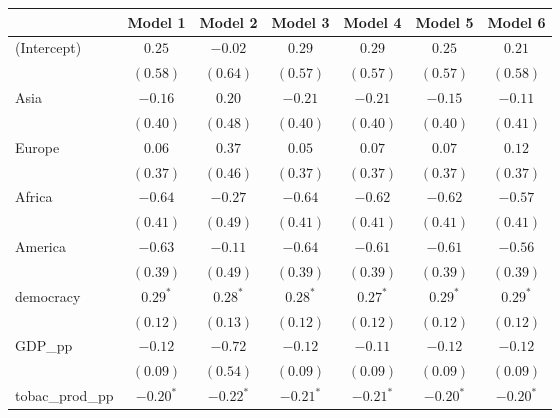 
\begin{table}[!h]
\begin{center}
\begin{tabular}{l c c c c c c }
\toprule
 & Model 1 & Model 2 & Model 3 & Model 4 & Model 5 & Model 6 \\
\midrule
(Intercept)             & $0.25$       & $-0.02$      & $0.29$       & $0.29$       & $0.25$       & $0.21$       \\
                        & $(0.58)$     & $(0.64)$     & $(0.57)$     & $(0.57)$     & $(0.57)$     & $(0.58)$     \\
Asia                    & $-0.16$      & $0.20$       & $-0.21$      & $-0.21$      & $-0.15$      & $-0.11$      \\
                        & $(0.40)$     & $(0.48)$     & $(0.40)$     & $(0.40)$     & $(0.40)$     & $(0.41)$     \\
Europe                  & $0.06$       & $0.37$       & $0.05$       & $0.07$       & $0.07$       & $0.12$       \\
                        & $(0.37)$     & $(0.46)$     & $(0.37)$     & $(0.37)$     & $(0.37)$     & $(0.37)$     \\
Africa                  & $-0.64$      & $-0.27$      & $-0.64$      & $-0.62$      & $-0.62$      & $-0.57$      \\
                        & $(0.41)$     & $(0.49)$     & $(0.41)$     & $(0.41)$     & $(0.41)$     & $(0.41)$     \\
America                 & $-0.63$      & $-0.11$      & $-0.64$      & $-0.61$      & $-0.61$      & $-0.56$      \\
                        & $(0.39)$     & $(0.49)$     & $(0.39)$     & $(0.39)$     & $(0.39)$     & $(0.39)$     \\
democracy               & $0.29^{*}$   & $0.28^{*}$   & $0.28^{*}$   & $0.27^{*}$   & $0.29^{*}$   & $0.29^{*}$   \\
                        & $(0.12)$     & $(0.13)$     & $(0.12)$     & $(0.12)$     & $(0.12)$     & $(0.12)$     \\
GDP\_pp                 & $-0.12$      & $-0.72$      & $-0.12$      & $-0.11$      & $-0.12$      & $-0.12$      \\
                        & $(0.09)$     & $(0.54)$     & $(0.09)$     & $(0.09)$     & $(0.09)$     & $(0.09)$     \\
tobac\_prod\_pp         & $-0.20^{*}$  & $-0.22^{*}$  & $-0.21^{*}$  & $-0.21^{*}$  & $-0.20^{*}$  & $-0.20^{*}$  \\

\end{tabular}
\end{center}
\end{table}
